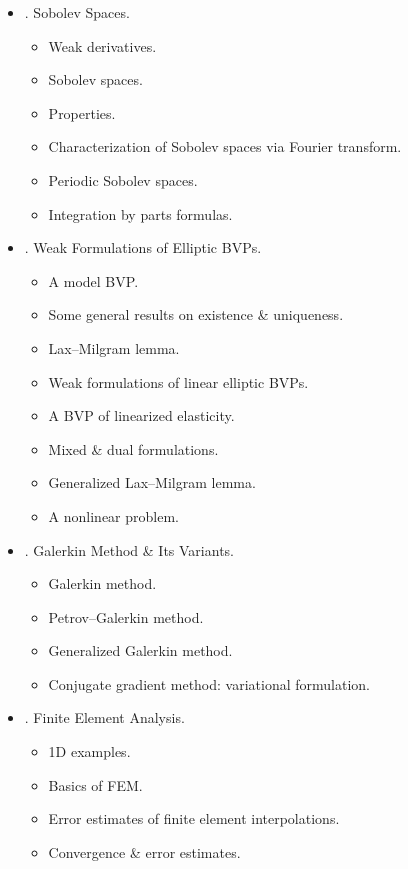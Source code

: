 \documentclass{article}
\begin{document}
\begin{enumerate}
\begin{itemize}
		\item {. Sobolev Spaces.}
		\begin{itemize}
			\item {\sf Weak derivatives.}
			\item {\sf Sobolev spaces.}
			\item {\sf Properties.}
			\item {\sf Characterization of Sobolev spaces via Fourier transform.}
			\item {\sf Periodic Sobolev spaces.}
			\item {\sf Integration by parts formulas.}
		\end{itemize}
		\item {. Weak Formulations of Elliptic BVPs.}
		\begin{itemize}
			\item {\sf A model BVP.}
			\item {\sf Some general results on existence \& uniqueness.}
			\item {\sf Lax--Milgram lemma.}
			\item {\sf Weak formulations of linear elliptic BVPs.}
			\item {\sf A BVP of linearized elasticity.}
			\item {\sf Mixed \& dual formulations.}
			\item {\sf Generalized Lax--Milgram lemma.}
			\item {\sf A nonlinear problem.}
		\end{itemize}
		\item {. Galerkin Method \& Its Variants.}
		\begin{itemize}
			\item {\sf Galerkin method.}
			\item {\sf Petrov--Galerkin method.}
			\item {\sf Generalized Galerkin method.}
			\item {\sf Conjugate gradient method: variational formulation.}
		\end{itemize}
		\item {. Finite Element Analysis.}
		\begin{itemize}
			\item {\sf1D examples.}
			\item {\sf Basics of FEM.}
			\item {\sf Error estimates of finite element interpolations.}
			\item {\sf Convergence \& error estimates.}
		\end{itemize}

\end{itemize}
\end{enumerate}
\end{document}

